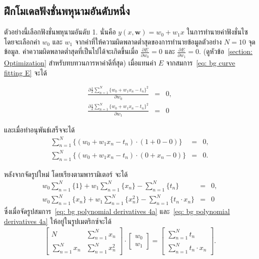 \subsection{ฝึกโมเดลฟังชั่นพหุนามอันดับหนึ่ง}
ตัวอย่างนี้เลือกฟังชั่นพหุนามอันดับ 1. 
นั่นคือ $y(x, \mathbf{w}) = w_0 + w_1 x$ ในการทำนายค่าฟังชั่นไซ
โดยจะเลือกค่า $w_0$ และ $w_1$ จากค่าที่ให้ความผิดพลาดต่ำสุดของการทำนายข้อมูลตัวอย่าง $N=10$ จุดข้อมูล.
ค่าความผิดพลาดต่ำสุดที่เป็นไปได้จะเกิดขึ้นเมื่อ $\frac{\partial E}{\partial w_0} = 0$ 
และ $\frac{\partial E}{\partial w_1} = 0$.
(ดูหัวข้อ~\ref{section: Optimization} สำหรับทบทวนการหาค่าดีที่สุด)
เมื่อแทนค่า $E$ จากสมการ~\ref{eq: bg curve fitting E} จะได้

\begin{eqnarray}
\frac{\partial \frac{1}{2} \sum_{n=1}^N \{ w_0 + w_1 x_n - t_n \}^2}{\partial w_0} &=& 0, 
\label{eq: bg polynomial derivatives 2a}
\\
\frac{\partial \frac{1}{2} \sum_{n=1}^N \{ w_0 + w_1 x_n - t_n \}^2}{\partial w_1} &=& 0
\label{eq: bg polynomial derivatives 2b}
\end{eqnarray}

และเมื่อทำอนุพันธ์เสร็จจะได้
\begin{eqnarray}
\sum_{n=1}^N \{ (w_0 + w_1 x_n - t_n) \cdot (1 + 0 - 0) \} &=& 0, 
\label{eq: bg polynomial derivatives 3a} \\
\sum_{n=1}^N \{ (w_0 + w_1 x_n - t_n) \cdot (0 + x_n - 0) \} &=& 0.
\label{eq: bg polynomial derivatives 3b}
\end{eqnarray}

หลังจากจัดรูปใหม่ โดยเรียงตามพารามิเตอร์ จะได้
\begin{eqnarray}
%
  w_0 \sum_{n=1}^N \{ 1 \} + w_1 \sum_{n=1}^N \{ x_n \} - \sum_{n=1}^N \{ t_n \} &=& 0, 
\label{eq: bg polynomial derivatives 4a} \\
  w_0 \sum_{n=1}^N \{ x_n \} + w_1 \sum_{n=1}^N \{ x_n^2 \} - \sum_{n=1}^N \{ t_n \cdot x_n \} &=& 0 
\label{eq: bg polynomial derivatives 4b}
\end{eqnarray}
ซึ่งเมื่อจัดรูปสมการ~\ref{eq: bg polynomial derivatives 4a} และ~\ref{eq: bg polynomial derivatives 4a} ให้อยู่ในรูปเมตริกซ์จะได้
\begin{eqnarray}
%
\left[ 
\begin{matrix}
N & \sum_{n=1}^N x_n \\
\sum_{n=1}^N x_n & \sum_{n=1}^N x_n^2
\end{matrix}
\right] \cdot 
\left[ 
\begin{matrix}
w_0 \\
w_1
\end{matrix}
\right]
=
\left[ 
\begin{matrix}
\sum_{n=1}^N t_n \\
\sum_{n=1}^N t_n \cdot x_n
\end{matrix}
\right].
\label{eq: bg polynomial M1}
\end{eqnarray}

